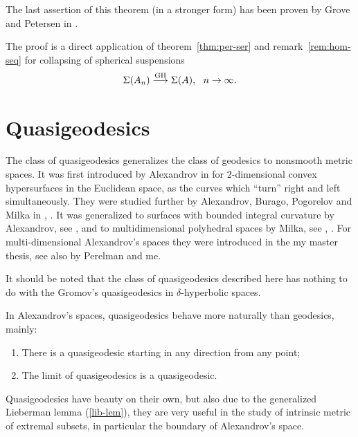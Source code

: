 \documentclass{article}
\begin{document}
The last assertion of this theorem (in a stronger form) has been proven 
by Grove and Petersen in \cite[3(3)]{grove-petersen:rad-sphere}.

The proof is a direct application of theorem~\ref{thm:per-ser} and remark~\ref{rem:hom-seq}
for collapsing of spherical suspensions
$$\Sigma(A_n)\GHto\Sigma(A),\ \ n\to\infty.$$













\section{Quasigeodesics}\label{QG}

The class of quasigeodesics
generalizes the class of geodesics to nonsmooth metric spaces.
It was first introduced by Alexandrov in \cite{alexandrov:qg} for
$2$-dimensional convex hypersurfaces in the Euclidean space, as the curves which
``turn'' right and left simultaneously.
They were studied further by Alexandrov, Burago, Pogorelov and Milka
in \cite{alexandrov-burago},  \cite{pogorelov:qg}
\cite{milka:qg}.
It was generalized to surfaces with bounded integral
curvature by Alexandrov, see \cite{alexandrov:int-qg}, 
and to multidimensional polyhedral spaces by Milka, see \cite{milka:poly1},
\cite{milka:poly2}.
For multi-dimensional Alexandrov's spaces they were introduced in the my master thesis, see also \cite{perelman-petrunin:qg} by Perelman and me.

It should be noted that the class of quasigeodesics
described here has nothing to do with the Gromov's quasigeodesics in
$\delta$-hyperbolic spaces. 

In Alexandrov's spaces, quasigeodesics behave more naturally than geodesics, mainly: 
\begin{enumerate}[$\diamond$]
\item There is a quasigeodesic starting in any direction from any point; 
\item The limit of quasigeodesics is a quasigeodesic.
\end{enumerate}

Quasigeodesics have beauty on their own, but also
due to the generalized Lieberman lemma (\ref{lib-lem}), they are very useful in the
study of intrinsic metric of extremal subsets, in particular the boundary of
Alexandrov's space. 
\end{document}
